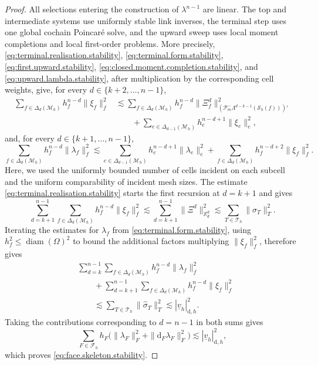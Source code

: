 \documentclass[a4paper,11pt]{article}
\theoremstyle{definition}
\newcommand{\DIFF}{\mathrm{d}}
\newcommand{\Mh}{\mathcal{M}_h}
\newcommand{\Sh}{\mathcal{S}_h}
\newcommand{\FM}[1]{\Delta_{#1}}
\newcommand{\PLtrim}[2]{\mathcal{P}_{#1}^{-}\Lambda^{#2}}
\begin{document}
\begin{proof}
All selections entering the construction of $\lambda^{n-1}$ are linear.
The top and intermediate systems use uniformly stable link inverses, the terminal step uses one global cochain Poincar\'e solve, and the upward sweep uses local moment completions and local first-order problems.
More precisely, \eqref{eq:terminal.realisation.stability}, \eqref{eq:terminal.form.stability}, \eqref{eq:first.upward.stability}, \eqref{eq:closed.moment.completion.stability}, and \eqref{eq:upward.lambda.stability}, after multiplication by the corresponding cell weights, give, for every $d\in\{k+2,\ldots,n-1\}$,
\[
\begin{aligned}
  \sum_{f\in\FM{d}(\Mh)}
  h_f^{n-d}\|\xi_f\|_f^2
  &\lesssim
  \sum_{f\in\FM{d}(\Mh)}
  h_f^{n-d}
  \|\Xi_f^d\|_{\left(\PLtrim{m}{d-k-1}(\Sh(f))\right)'}^2
  \\
  &\qquad+
  \sum_{e\in\FM{d-1}(\Mh)}
  h_e^{n-d+1}\|\xi_e\|_e^2,
\end{aligned}
\]
and, for every $d\in\{k+1,\ldots,n-1\}$,
\[
  \sum_{f\in\FM{d}(\Mh)}
  h_f^{n-d}\|\lambda_f\|_f^2
  \lesssim
  \sum_{e\in\FM{d-1}(\Mh)}
  h_e^{n-d+1}\|\lambda_e\|_e^2
  +
  \sum_{f\in\FM{d}(\Mh)}
  h_f^{n-d+2}\|\xi_f\|_f^2.
\]
Here, we used the uniformly bounded number of cells incident on each subcell and the uniform comparability of incident mesh sizes.
The estimate \eqref{eq:terminal.realisation.stability} starts the first recursion at $d=k+1$ and gives
\[
  \sum_{d=k+1}^{n-1}
  \sum_{f\in\FM{d}(\Mh)}
  h_f^{n-d}\|\xi_f\|_f^2
  \lesssim
  \sum_{d=k+1}^{n-1}\|\Xi^d\|_{\mathbb X_d^d}^2
  \lesssim
  \sum_{T\in\mathcal T_h}\|\widehat\sigma_T\|_T^2.
\]
Iterating the estimates for $\lambda_f$ from \eqref{eq:terminal.form.stability}, using $h_f^2\leq\operatorname{diam}(\Omega)^2$ to bound the additional factors multiplying $\|\xi_f\|_f^2$, therefore gives
\[
\begin{aligned}
  &
  \sum_{d=k}^{n-1}
  \sum_{f\in\FM{d}(\Mh)}
  h_f^{n-d}\|\lambda_f\|_f^2
  \\
  &\qquad+
  \sum_{d=k+1}^{n-1}
  \sum_{f\in\FM{d}(\Mh)}
  h_f^{n-d}\|\xi_f\|_f^2
  \\
  &\qquad\lesssim
  \sum_{T\in\mathcal T_h}
  \|\widehat\sigma_T\|_T^2
  \lesssim
  |\underline v_h|_{\DIFF,h}^2.
\end{aligned}
\]
Taking the contributions corresponding to $d=n-1$ in both sums gives
\[
  \sum_{F\in\mathcal F_h}
  h_F\bigl(\|\lambda_F\|_F^2+\|\DIFF_F\lambda_F\|_F^2\bigr)
  \lesssim
  |\underline v_h|_{\DIFF,h}^2,
\]
which proves \eqref{eq:face.skeleton.stability}.
\end{proof}
\end{document}
